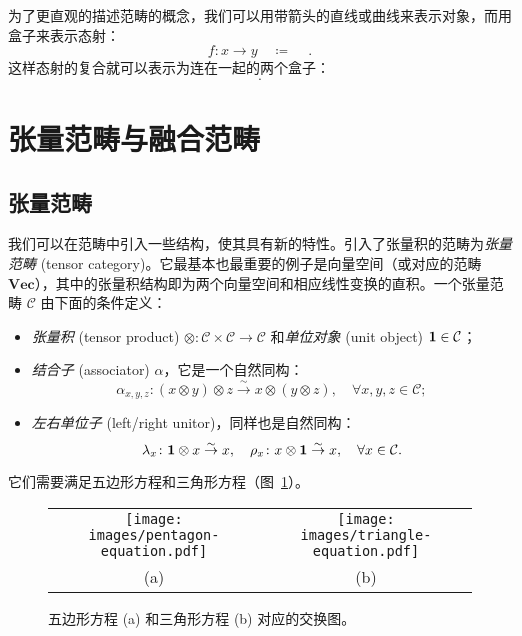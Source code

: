 为了更直观的描述范畴的概念，我们可以用带箭头的直线或曲线来表示对象，而用盒子来表示态射：
\begin{equation}
  f\colon x\to y \quad \coloneq \quad
   \, .
\end{equation}
这样态射的复合就可以表示为连在一起的两个盒子：
\begin{equation}
  .
\end{equation}

\section{张量范畴与融合范畴}

\subsection{张量范畴}

我们可以在范畴中引入一些结构，使其具有新的特性。引入了张量积的范畴为\emph{张量范畴} (tensor category)。它最基本也最重要的例子是向量空间（或对应的范畴 $\mathbf{Vec}$），其中的张量积结构即为两个向量空间和相应线性变换的直积。一个张量范畴 $\mathcal{C}$ 由下面的条件定义：
\begin{itemize}
  \item \emph{张量积} (tensor product) $\otimes\colon\mathcal{C}\times\mathcal{C}\to\mathcal{C}$ 和\emph{单位对象} (unit object) $\mathbf{1}\in\mathcal{C}$；
  \item \emph{结合子} (associator) $\alpha$，它是一个自然同构：
    \begin{equation}
      \alpha_{x,y,z} \colon (x\otimes y)\otimes z \overset\sim\to x\otimes(y\otimes z), \quad \forall x,y,z \in \mathcal{C};
    \end{equation}
  \item \emph{左右单位子} (left/right unitor)，同样也是自然同构：
    \begin{equation}
      \lambda_x \colon \mathbf{1}\otimes x \overset\sim\to x, \quad
      \rho_x    \colon x\otimes\mathbf{1}  \overset\sim\to x, \quad
      \forall x \in \mathcal{C}.
    \end{equation}
\end{itemize}
它们需要满足五边形方程和三角形方程（图~\ref{fig:pentagon-triangle-equation}）。

\begin{figure}[htb]
  \centering
  \begin{tabular}{cc}
    \texttt{[image: images/pentagon-equation.pdf]} &
    \texttt{[image: images/triangle-equation.pdf]} \\
    (a) & (b)
  \end{tabular}
  \caption[五边形方程和三角形方程对应的交换图]{五边形方程 (a) 和三角形方程 (b) 对应的交换图。}
  \label{fig:pentagon-triangle-equation}
\end{figure}

